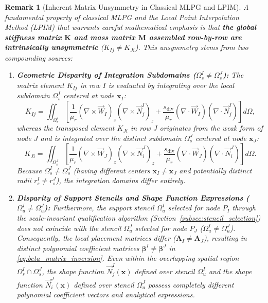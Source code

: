 \documentclass[preprint,12pt]{elsarticle}
\newtheorem{remark}{Remark}
\begin{document}
\begin{remark}[Inherent Matrix Unsymmetry in Classical MLPG and LPIM]
    A fundamental property of classical MLPG \cite{atluri2002meshless} and the Local Point Interpolation Method (LPIM) \cite{liu2001local, liu2005introduction} that warrants careful mathematical emphasis is that \textbf{the global stiffness matrix $\mathbf{K}$ and mass matrix $\mathbf{M}$ assembled row-by-row are intrinsically unsymmetric} ($K_{Ij} \ne K_{Ji}$).
    This unsymmetry stems from two compounding sources:
    \begin{enumerate}
        \item \textbf{Geometric Disparity of Integration Subdomains ($\Omega_s^I \ne \Omega_s^J$):}
              The matrix element $K_{Ij}$ in row $I$ is evaluated by integrating over the local subdomain $\Omega_s^I$ centered at node $\mathbf{x}_I$:
              \begin{equation}
                  K_{Ij} = \iint_{\Omega_s^I} \left[ \frac{1}{\mu_r} (\nabla \times \vec{W}_I)_z (\nabla \times \vec{N}_j^I)_z + \frac{s_{\mathrm{div}}}{\mu_r} (\nabla \cdot \vec{W}_I) (\nabla \cdot \vec{N}_j^I) \right] d\Omega,
              \end{equation}
              whereas the transposed element $K_{Ji}$ in row $J$ originates from the weak form of node $J$ and is integrated over the distinct subdomain $\Omega_s^J$ centered at node $\mathbf{x}_J$:
              \begin{equation}
                  K_{Ji} = \iint_{\Omega_s^J} \left[ \frac{1}{\mu_r} (\nabla \times \vec{W}_J)_z (\nabla \times \vec{N}_i^J)_z + \frac{s_{\mathrm{div}}}{\mu_r} (\nabla \cdot \vec{W}_J) (\nabla \cdot \vec{N}_i^J) \right] d\Omega.
              \end{equation}
              Because $\Omega_s^I \ne \Omega_s^J$ (having different centers $\mathbf{x}_I \ne \mathbf{x}_J$ and potentially distinct radii $r_s^I \ne r_s^J$), the integration domains differ entirely.
        \item \textbf{Disparity of Support Stencils and Shape Function Expressions ($\Omega_u^I \ne \Omega_u^J$):}
              Furthermore, the support stencil $\Omega_u^I$ selected for node $P_I$ through the scale-invariant qualification algorithm (Section~\ref{subsec:stencil_selection}) does not coincide with the stencil $\Omega_u^J$ selected for node $P_J$ ($\Omega_u^I \ne \Omega_u^J$). Consequently, the local placement matrices differ ($\mathbf{A}_I \ne \mathbf{A}_J$), resulting in distinct polynomial coefficient matrices $\boldsymbol{\beta}^I \ne \boldsymbol{\beta}^J$ in \eqref{eq:beta_matrix_inversion}. Even within the overlapping spatial region $\Omega_s^I \cap \Omega_s^J$, the shape function $\vec{N}_j^I(\mathbf{x})$ defined over stencil $\Omega_u^I$ and the shape function $\vec{N}_i^J(\mathbf{x})$ defined over stencil $\Omega_u^J$ possess completely different polynomial coefficient vectors and analytical expressions.

\end{enumerate}
\end{remark}
\end{document}
